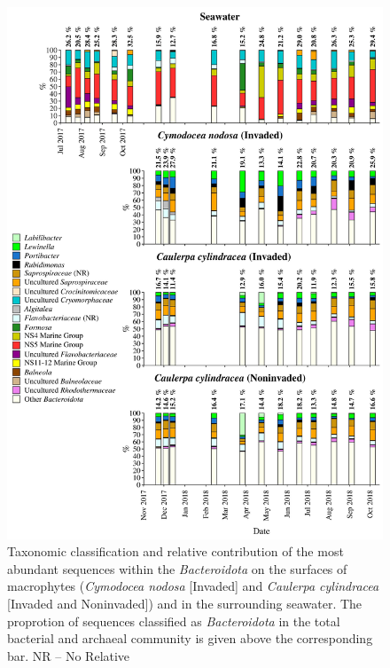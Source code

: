\documentclass[12pt,]{article}
\begin{document}
\begin{figure}[H]

{\centering \includegraphics[width=0.85\linewidth]{../results/figures/bacteroidota_bar_plot} 

}

\caption{Taxonomic classification and relative contribution of the most abundant sequences within the \textit{Bacteroidota} on the surfaces of macrophytes (\textit{Cymodocea nodosa} [Invaded] and \textit{Caulerpa cylindracea} [Invaded and Noninvaded]) and in the surrounding seawater. The proprotion of sequences classified as \textit{Bacteroidota} in the total bacterial and archaeal community is given above the corresponding bar. NR -- No Relative\label{bactero}}\label{fig:unnamed-chunk-8}
\end{figure}
\end{document}
